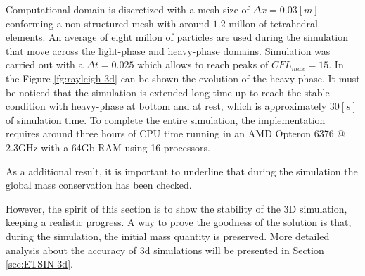 \documentclass[a4paper,conference]{IEEEtran}
\begin{document}
Computational domain is discretized with a mesh size of $\Delta x=0.03[m]$ conforming a non-structured mesh with around $1.2$ millon of tetrahedral elements. An average of eight millon of particles are used during the simulation that move across the light-phase and heavy-phase domains. Simulation was carried out with a $\Delta t=0.025$ which allows to reach peaks of $CFL_{max}=15$. In the Figure \ref{fg:rayleigh-3d} can be shown the evolution of the heavy-phase. It must be noticed that the simulation is extended long time up to reach the stable condition with heavy-phase at bottom and at rest, which is approximately $30[s]$ of simulation time. To complete the entire simulation, the implementation requires around three hours of CPU time running in an AMD Opteron 6376 @ 2.3GHz with a 64Gb RAM using 16 processors.

As a additional result, it is important to underline that during the simulation the global mass conservation has been checked.

 However, the spirit of this section is to show the stability of the 3D simulation, keeping a realistic progress. A way to prove the goodness of the solution is that, during the simulation, the initial mass quantity is preserved. More detailed analysis about the accuracy of 3d simulations will be presented in Section \ref{sec:ETSIN-3d}.
\end{document}
